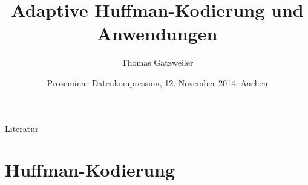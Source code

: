 \documentclass[xcolor=dvipsnames,presentation]{beamer}    %
\title[Huffman-Kodierung]{Adaptive Huffman-Kodierung und Anwendungen}
\author[Gatzweiler]{Thomas Gatzweiler}
\institute[RWTH Aachen University] %
{
  \strut Human Language Technology and Pattern Recognition\\
  \strut Computer Science Department, RWTH Aachen University %
}
\date[12. November 2014]{Proseminar Datenkompression, 12. November 2014, Aachen}
\begin{document}
\nocite{*}

\begin{frame}[label=titlepage]
  \titlepage
\end{frame}


%




\begin{frame}[allowframebreaks]{Literatur}
 
 
\end{frame}


\section{Huffman-Kodierung}
\end{document}
